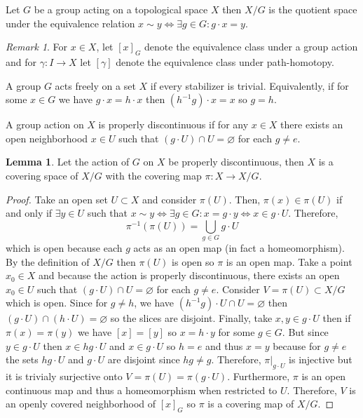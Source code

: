\documentclass[12pt]{article}
\renewcommand{\empty}{\varnothing}
\theoremstyle{remark}
\newtheorem*{remark}{Remark}
\theoremstyle{definition}
\newtheorem{lemma}[theorem]{Lemma}
\newenvironment{definition}[1][Definition:]{\begin{trivlist}
\item[\hskip \labelsep {\bfseries #1}]}{\end{trivlist}}
\begin{document}
\begin{definition}
Let $G$ be a group acting on a topological space $X$ then $X/G$ is the quotient space under the equivalence relation $x \sim y \iff \exists g \in G : g \cdot x = y$. 
\end{definition}

\begin{remark}
For $x \in X$, let $[x]_G$ denote the equivalence class under a group action and for $\gamma : I \to X$ let $[\gamma]$ denote the equivalence class under path-homotopy. 
\end{remark}

\begin{definition}
A group $G$ acts freely on a set $X$ if every stabilizer is trivial. Equivalently, if for some $x \in G$ we have $g \cdot x = h \cdot x$ then $(h^{-1}g) \cdot x = x$ so $g = h$. 
\end{definition}

\begin{definition}
A group action on $X$ is properly discontinuous if for any $x \in X$ there exists an open neighborhood $x \in U$ such that $(g \cdot U) \cap U = \empty$ for each $g \neq e$. 
\end{definition}

\begin{lemma}
Let the action of $G$ on $X$ be properly discontinuous, then $X$ is a covering space of $X/G$ with the covering map $\pi : X \to X/G$.
\end{lemma}

\begin{proof}
Take an open set $U \subset X$ and consider $\pi(U)$. Then, $\pi(x) \in \pi(U)$ if and only if $\exists y \in U$ such that $x \sim y \iff \exists g \in G : x = g \cdot y \iff x \in g \cdot U$. Therefore,
\[\pi^{-1}(\pi(U))  = \bigcup_{g \in G} g \cdot U\] which is open because each $g$ acts as an open map (in fact a homeomorphism). By the definition of $X/G$ then $\pi(U)$ is open so $\pi$ is an open map. Take a point $x_0 \in X$ and because the action is properly discontinuous, there exists an open $x_0 \in U$ such that $(g \cdot U) \cap U = \empty$ for each $g \neq e$. Consider $V = \pi(U) \subset X/G$ which is open. Since for $g \neq h$, we have $(h^{-1} g) \cdot U \cap U = \empty$ then $(g \cdot U) \cap (h \cdot U) = \empty$ so the slices are disjoint. Finally, take $x, y \in g \cdot U$ then if $\pi(x) = \pi(y)$ we have $[x] = [y]$ so $x = h \cdot y$ for some $g \in G$. But since $y \in g \cdot U$ then $x \in hg \cdot U$ and $x \in g \cdot U$ so $h = e$ and thus $x = y$ because for $g \neq e$ the sets $hg \cdot U$ and $g \cdot U$ are disjoint since $hg \neq g$. Therefore, $\pi|_{g \cdot U}$ is injective but it is trivialy surjective onto $V = \pi(U) = \pi(g \cdot U)$. Furthermore, $\pi$ is an open continuous map and thus a homeomorphism when restricted to $U$. Therefore, $V$ is an openly covered neighborhood of $[x]_G$ so $\pi$ is a covering map of $X/G$.  
\end{proof}
\end{document}
